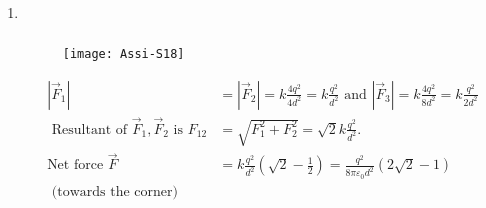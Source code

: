 \begin{enumerate}
\begin{answer}
\begin{align*}
		\Rightarrow-\sqrt{2 A} t&=-d^{3 / 2} \frac{\pi}{2} \Rightarrow-\sqrt{\frac{q^{2}}{16 \pi m \varepsilon_{0}}} \times t=-d^{3 / 2} \frac{\pi}{2} \\
		\Rightarrow t&=d^{3 / 2} \frac{\pi}{2} \times \sqrt{\frac{8 \pi m \varepsilon_{0}}{q^{2}}}=\frac{\sqrt{2 \pi^{3} \varepsilon_{0} m d^{3}}}{q}
	\intertext{	Time taken by charge when it is released at a distance $d / 2$ is}
		t^{\prime}&=\frac{\sqrt{2 \pi^{3} \varepsilon_{0} m(d / 2)^{3}}}{q}=\frac{\sqrt{2 \pi^{3} \varepsilon_{0} m d^{3}}}{\sqrt{8} q}=\frac{t}{2 \sqrt{2}}
		\end{align*}
	\end{answer}
	\item $\left. \right. $
	\begin{answer}$\left. \right. $
		\begin{figure}[H]
			\centering
			\texttt{[image: Assi-S18]}
		\end{figure}
		\begin{align*}
		\left|\vec{F}_{1}\right|&=\left|\vec{F}_{2}\right|=k \frac{4 q^{2}}{4 d^{2}}=k \frac{q^{2}}{d^{2}}\text{ and }\left|\vec{F}_{3}\right|=k \frac{4 q^{2}}{8 d^{2}}=k \frac{q^{2}}{2 d^{2}}\\
		\text{ Resultant of }\vec{F}_{1}, \vec{F}_{2}\text{ is } F_{12}&=\sqrt{F_{1}^{2}+F_{2}^{2}}=\sqrt{2} k \frac{q^{2}}{d^{2}}.\\
		\text{Net force }\vec{F}&=k \frac{q^{2}}{d^{2}}\left(\sqrt{2}-\frac{1}{2}\right)=\frac{q^{2}}{8 \pi \varepsilon_{0} d^{2}}(2 \sqrt{2}-1)\\
		\text{ (towards the corner)}&
		\end{align*}
	\end{answer}
	
	
	
	
	
	
	
	
	
	
	
	
\end{enumerate}